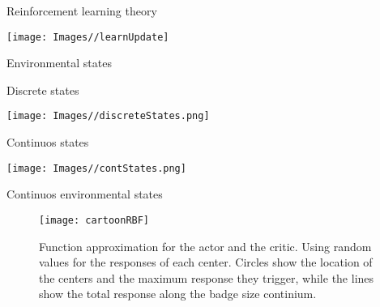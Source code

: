 \documentclass[
  ignorenonframetext,
]{beamer}
\begin{document}
\begin{frame}{Reinforcement learning theory}
\protect\hypertarget{reinforcement-learning-theory-1}{}

\begin{center}\texttt{[image: Images//learnUpdate]} \end{center}

\end{frame}

\begin{frame}{Environmental states}
\protect\hypertarget{environmental-states}{}

\begin{block}{Discrete states}

\texttt{[image: Images//discreteStates.png]}

\pause

\end{block}

\begin{block}{Continuos states}

\texttt{[image: Images//contStates.png]}

\end{block}

\end{frame}

\begin{frame}{Continuos environmental states}
\protect\hypertarget{continuos-environmental-states}{}

\begin{figure}
\texttt{[image: cartoonRBF]} \caption{\label{fig:learning_cartoonRBF}Function approximation for the actor and the critic. Using random values for the responses of each center. Circles show the location of the centers and the maximum response they trigger, while the lines show the total response along the badge size continium.}\label{fig:fig2}
\end{figure}

\end{frame}
\end{document}
